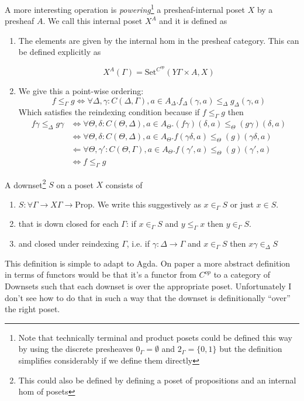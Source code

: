 \documentclass{article}
\newcommand{\Set}{\textrm{Set}}
\newcommand{\Prop}{\textrm{Prop}}
\begin{document}
A more interesting operation is \emph{powering}\footnote{Note that
technically terminal and product posets could be defined this way by
using the discrete presheaves $0_\Gamma = \emptyset$ and $2_\Gamma =
\{ 0,1\}$ but the definition simplifies considerably if we define them
directly} a presheaf-internal poset $X$ by a presheaf $A$. We call
this internal poset $X^A$ and it is defined as
\begin{enumerate}
\item The elements are given by the internal hom in the presheaf
  category. This can be defined explicitly as

  \[ X^A(\Gamma) = \Set^{C^{op}}(Y\Gamma \times A, X) \]
\item We give this a point-wise ordering:
  \[ f \leq_{\Gamma} g \iff \forall \Delta, \gamma : C(\Delta,\Gamma), a \in A_\Delta.
  f_\Delta(\gamma,a) \leq_{\Delta} g_\Delta(\gamma,a)
  \]
  Which satisfies the reindexing condition because if $f\leq_\Gamma g$ then
  \begin{align*}
    f \gamma \leq_{\Delta} g\gamma
    &\iff \forall \Theta, \delta : C(\Theta,\Delta), a \in A_\Theta.
    (f\gamma)(\delta, a) \leq_\Theta (g\gamma)(\delta,a)\\
    &\iff \forall \Theta, \delta : C(\Theta,\Delta), a \in A_\Theta.
    f(\gamma\delta, a) \leq_\Theta (g)(\gamma\delta,a)\\
    &\Leftarrow \forall \Theta, \gamma' : C(\Theta,\Gamma), a \in A_\Theta.
    f(\gamma', a) \leq_\Theta (g)(\gamma',a)\\
    &\iff f\leq_\Gamma g
  \end{align*}
\end{enumerate}

A downset\footnote{This could also be defined by defining a poset of propositions and an internal hom of posets} $S$ on a poset $X$ consists of
\begin{enumerate}
\item $S : \forall \Gamma \to X \Gamma \to \Prop$. We write this
  suggestively as $x \in_{\Gamma} S$ or just $x \in S$.
\item that is down closed for each $\Gamma$: if $x \in_\Gamma S$ and
  $y \leq_\Gamma x$ then $y \in_\Gamma S$.
\item and closed under reindexing $\Gamma$, i.e. if $\gamma : \Delta
  \to \Gamma$ and $x \in_\Gamma S$ then $x\gamma \in_\Delta S$
\end{enumerate}
This definition is simple to adapt to Agda. On paper a more abstract
definition in terms of functors would be that it's a functor from
$C^{op}$ to a category of Downsets such that each downset is over the
appropriate poset. Unfortunately I don't see how to do that in such a
way that the downset is definitionally ``over'' the right poset.
\end{document}
